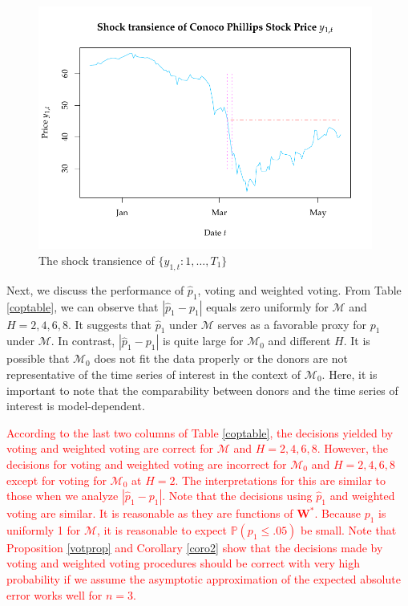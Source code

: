 \documentclass[11pt]{article}
\def\mbf#1{\mathbf{#1}} %
\def\mc#1{\mathcal{#1}} %
\def\mc#1{\mathcal{#1}}
\def\P{\mathbb{P}}
\theoremstyle{definition}
\begin{document}
\begin{figure}[H]
	\begin{center}
		\includegraphics[height = 8cm]{COPtransience.pdf}
		\caption{The shock transience of $\{y_{1,t} \colon 1, \ldots, T_1\}$} \label{copshocktransience}
	\end{center}	
\end{figure}

Next, we discuss the performance of $\hat{p}_1$, voting and weighted voting. From Table \ref{coptable},  we can observe that $|\hat{p}_1-p_1|$ equals zero uniformly for $\mc{M}$ and $H = 2, 4, 6, 8$. It suggests that $\hat{p}_1$ under $\mc{M}$ serves as a favorable proxy for $p_1$ under $\mc{M}$. In contrast, $|\hat{p}_1-p_1|$ is quite large for $\mc{M}_0$ and different $H$. It is possible that $\mc{M}_0$  does not fit the data properly or the donors are not representative of the time series of interest in the context of $\mc{M}_0$. Here, it is important to note that  the comparability between donors and the time series of interest is model-dependent.

\textcolor{red}{According to the last two columns of Table \ref{coptable}, the decisions yielded by voting and weighted voting are correct for $\mc{M}$ and $H = 2, 4, 6, 8$. However, the decisions for voting and weighted voting are incorrect for $\mc{M}_0$ and $H=2, 4, 6, 8$ except for voting for $\mc{M}_0$ at $H = 2$. The interpretations for this are similar to those when we analyze $|\hat{p}_1-p_1|$. Note that the decisions using $\hat{p}_1$ and weighted voting are similar. It is reasonable as they are functions of $\mbf{W}^*$. Because $p_1$ is uniformly 1 for $\mc{M}$, it is reasonable to expect $\P(p_1\leq .05)$ be small. Note that Proposition \ref{votprop} and Corollary \ref{coro2} show that the decisions made by voting and weighted voting procedures should be correct with very high probability if we assume the asymptotic approximation of the expected absolute error works well for  $n = 3$.}
\end{document}
